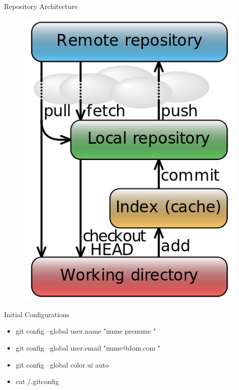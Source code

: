 \documentclass{workshop}
\begin{document}
\begin{frame}{Repository Architecture}
\begin{figure}
  \includegraphics[scale=0.3]{img/flow.png}
\end{figure}
\end{frame}

\begin{frame}{Initial Configurations}
\begin{itemize}
\item git config --global user.name "nume prenume "
\item git config --global user.email "nume@dom.com "
\item git config --global color.ui auto
\item cat /.gitconfig
\end{itemize}
\end{frame}
\end{document}
